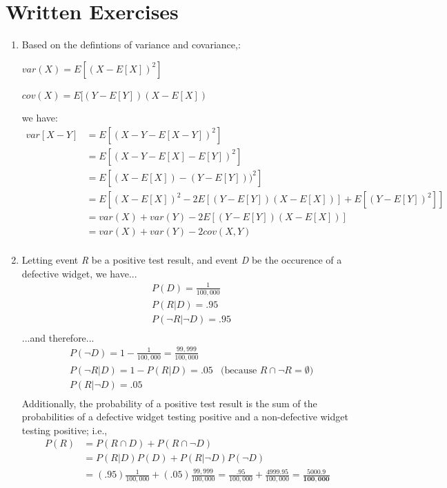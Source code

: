 \documentclass{report}
\begin{document}
\section*{Written Exercises}	
\begin{enumerate}
	\item Based on the defintions of variance and covariance,:\\
	\centerline{$var(X) = E[(X - E[X])^2]$}
	\centerline{$cov(X) = E[(Y - E[Y])(X - E[X])$}
	we have:
	\begin{align*}
    var[X-Y] &= E[( X - Y - E[X - Y])^2]  \\
    	 	 &= E[( X - Y - E[X] - E[Y])^2] \\
    	 	 &= E[( X - E[X]) - (Y - E[Y]) )^2] \\
    	 	 &= E[( X - E[X])^2 - 2E[(Y - E[Y])(X - E[X])] + E[(Y - E[Y])^2]] \\
    	 	 &= var(X) + var(Y) - 2E[(Y - E[Y])(X - E[X])] \\
    	 	 &= var(X) + var(Y) - 2cov(X,Y ) \\
    \end{align*}
	\item Letting event \textit{R} be a positive test result, and event \textit{D} be the occurence of a defective widget, we have...
	\begin{align*}
	     & P(D) = \frac{1}{100,000} \\
	     & P(R \vert D) = .95  \\
	     & P(\lnot R \vert \lnot D) = .95 \\
	 \end{align*}
	    ...and therefore...
	    \begin{align*}
	     & P(\lnot D) 				= 1 - \frac{1}{100,000} = \frac{99,999}{100,000} \\
	     & P(\lnot R \vert 		D) 	= 1-  P(R \vert D) =.05  & 
	     \text{(because $R \cap \lnot R = \emptyset$)}\\
	     & P(R 		\vert \lnot D) 	= .05  \\
	 	\end{align*}
	 	Additionally, the probability of a positive test result is the sum of the probabilities of a  defective widget testing positive and a non-defective widget testing positive; i.e.,
	 	\begin{align*}
	 	 P(R) 	&= P(R \cap D) + P(R \cap \lnot D)\\
	 	 		&= P(R \vert D)P(D) + P(R \vert \lnot D)P(\lnot D) \\
	 	 		&= (.95)\frac{1}{100,000} + (.05)\frac{99,999}{100,000} 
	 	 		 = \frac{.95}{100,000} + \frac{4999.95}{100,000} 
	 	 		 = \mathbf{\frac{5000.9}{100,000}}\\
	    \end{align*}
	    

\end{enumerate}
\end{document}
